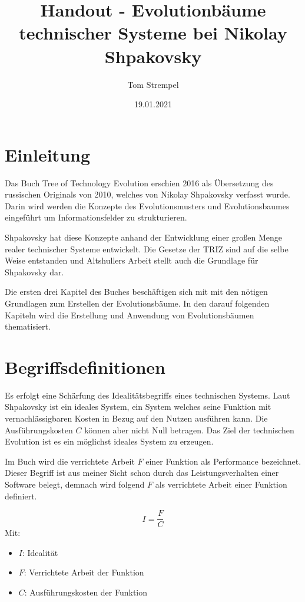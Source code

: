 \documentclass[11pt,a4paper]{article}
\title{Handout - Evolutionbäume technischer Systeme bei Nikolay Shpakovsky}
\author{Tom Strempel}
\date{19.01.2021}
\begin{document}
\maketitle

\section{Einleitung}

Das Buch Tree of Technology Evolution erschien 2016 als Übersetzung des russischen Originals von 2010, welches von Nikolay Shpakovsky verfasst wurde. Darin wird werden die Konzepte des Evolutionsmusters und Evolutionsbaumes eingeführt um Informationsfelder zu strukturieren.

Shpakovsky hat diese Konzepte anhand der Entwicklung einer großen Menge realer technischer Systeme entwickelt. Die Gesetze der TRIZ sind auf die selbe Weise entstanden und Altshullers Arbeit stellt auch die Grundlage für Shpakovsky dar. 

Die ersten drei Kapitel des Buches beschäftigen sich mit mit den nötigen Grundlagen zum Erstellen der Evolutionsbäume. In den darauf folgenden Kapiteln wird die Erstellung und Anwendung von Evolutionsbäumen thematisiert.

\section{Begriffsdefinitionen}

Es erfolgt eine Schärfung des Idealitätsbegriffs eines technischen Systems. Laut Shpakovsky ist ein ideales System, ein System welches seine Funktion mit vernachlässigbaren Kosten in Bezug auf den Nutzen ausführen kann. Die Ausführungskosten $C$ können aber nicht Null betragen. Das Ziel der technischen Evolution ist es ein möglichst ideales System zu erzeugen.

Im Buch wird die verrichtete Arbeit $F$ einer Funktion als \glqq Performance\grqq{} bezeichnet. Dieser Begriff ist aus meiner Sicht schon durch das Leistungsverhalten einer Software belegt, demnach wird folgend $F$ als verrichtete Arbeit einer Funktion definiert.

\begin{equation*}
    I = \frac{F}{C}
\end{equation*}
Mit:
\begin{itemize}
    \item $I$: Idealität
    \item $F$: Verrichtete Arbeit der Funktion
    \item $C$: Ausführungskosten der Funktion
\end{itemize}
\end{document}
